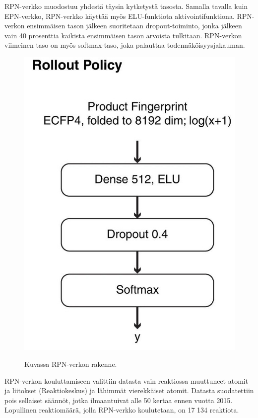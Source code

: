 \documentclass[finnish,twoside,censored,tkt,sw-line]{HYthesisML}
\begin{document}
RPN-verkko muodostuu yhdestä täysin kytketystä tasosta.
Samalla tavalla kuin EPN-verkko, RPN-verkko käyttää myös ELU-funktiota aktivointifunktiona.
RPN-verkon ensimmäisen tason jälkeen suoritetaan dropout-toiminto, jonka jälkeen vain 40 prosenttia kaikista ensimmäisen tason arvoista tulkitaan.
RPN-verkon viimeinen taso on myös softmax-taso, joka palauttaa todennäköisyysjakauman.

\begin{figure}[!ht]
    \centering
    \includegraphics[]{rollout-policy.jpg}
    \caption{Kuvassa RPN-verkon rakenne.}
    {\cite{SeglerMarwinHS2018Pcsw}}
    {\label{fig:3n-mcts-rpn}}
\end{figure}

RPN-verkon kouluttamiseen valittiin datasta vain reaktiossa muuttuneet atomit ja liitokset (Reaktiokeskus) ja lähimmät vierekkäiset atomit.
Datasta suodatettiin pois sellaiset säännöt, jotka ilmaantuivat alle 50 kertaa ennen vuotta 2015.
Lopullinen reaktiomäärä, jolla RPN-verkko koulutetaan, on 17 134 reaktiota.
\end{document}
